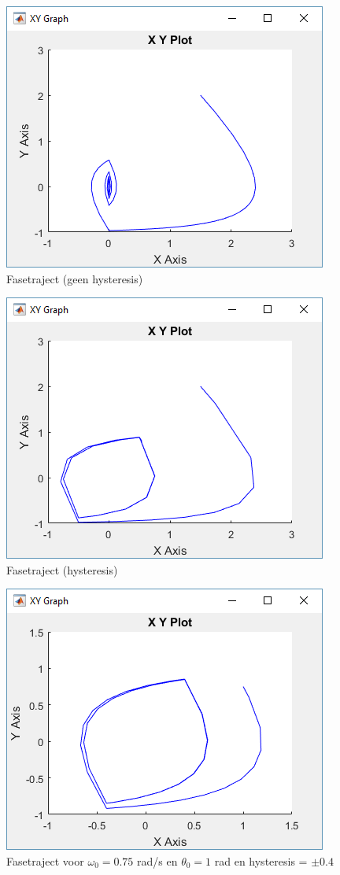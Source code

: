 \documentclass[12pt]{article}
\begin{document}
\newpage
\begin{figure}[!h]
	\centering
	\includegraphics[height=0.4\textheight, keepaspectratio]{xynohys.png}
	\caption{Fasetraject (geen hysteresis)}
	\label{xynohys}
\end{figure}
\begin{figure}[!h]
	\centering
	\includegraphics[height=0.4\textheight, keepaspectratio]{xyhys.png}
	\caption{Fasetraject (hysteresis)}
	\label{xyhys}
\end{figure}
\begin{figure}[!h]
	\centering
	\includegraphics[height=0.4\textheight, keepaspectratio]{xytwo.png}
	\caption{Fasetraject voor $\omega_0 = 0.75$ rad/s en $\theta_0 = 1$ rad en hysteresis = $\pm 0.4$}
	\label{xytwo}
\end{figure}
\end{document}
